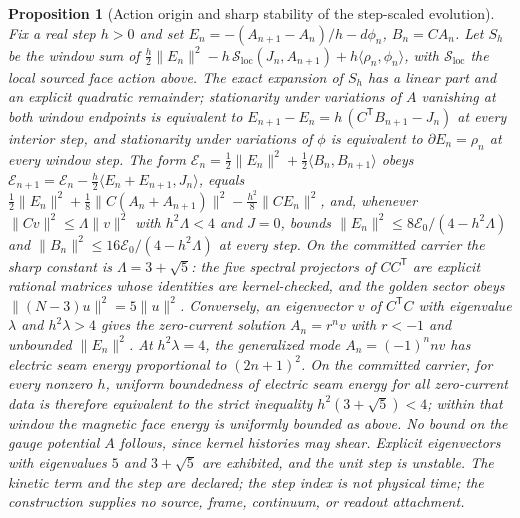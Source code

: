 \documentclass[11pt]{article}
\newtheorem{proposition}[theorem]{Proposition}
\theoremstyle{remark}
\theoremstyle{plain}
\begin{document}
\begin{proposition}[Action origin and sharp stability of the step-scaled evolution]
\label{prop:scaled-maxwell-stability}
Fix a real step \(h>0\) and set \(E_n=-(A_{n+1}-A_n)/h-d\phi_n\), \(B_n=CA_n\).
Let \(S_h\) be the window sum of
\(\tfrac h2\lVert E_n\rVert^2-h\,\mathcal S_{\mathrm{loc}}(J_n,A_{n+1})+h\langle\rho_n,\phi_n\rangle\),
with \(\mathcal S_{\mathrm{loc}}\) the local sourced face action above. The exact
expansion of \(S_h\) has a linear part and an explicit quadratic remainder;
stationarity under variations of \(A\) vanishing at both window endpoints is
equivalent to \(E_{n+1}-E_n=h\,(C^{\mathsf T}B_{n+1}-J_n)\) at every interior
step, and stationarity under variations of \(\phi\) is equivalent to
\(\partial E_n=\rho_n\) at every window step. The form
\(\mathcal E_n=\tfrac12\lVert E_n\rVert^2+\tfrac12\langle B_n,B_{n+1}\rangle\)
obeys \(\mathcal E_{n+1}=\mathcal E_n-\tfrac h2\langle E_n+E_{n+1},J_n\rangle\),
equals \(\tfrac12\lVert E_n\rVert^2+\tfrac18\lVert C(A_n+A_{n+1})\rVert^2-\tfrac{h^2}8\lVert CE_n\rVert^2\),
and, whenever \(\lVert Cv\rVert^2\le\Lambda\lVert v\rVert^2\) with \(h^2\Lambda<4\)
and \(J=0\), bounds \(\lVert E_n\rVert^2\le 8\mathcal E_0/(4-h^2\Lambda)\) and
\(\lVert B_n\rVert^2\le 16\mathcal E_0/(4-h^2\Lambda)\) at every step. On the
committed carrier the sharp constant is \(\Lambda=3+\sqrt5\): the five spectral
projectors of \(CC^{\mathsf T}\) are explicit rational matrices whose identities
are kernel-checked, and the golden sector obeys \(\lVert(N-3)u\rVert^2=5\lVert u\rVert^2\).
Conversely, an eigenvector \(v\) of \(C^{\mathsf T}C\) with eigenvalue \(\lambda\)
and \(h^2\lambda>4\) gives the zero-current solution \(A_n=r^nv\) with \(r<-1\) and
unbounded \(\lVert E_n\rVert^2\). At \(h^2\lambda=4\), the generalized mode
\(A_n=(-1)^n n v\) has electric seam energy proportional to
\((2n+1)^2\). On the committed carrier, for every nonzero \(h\), uniform
boundedness of electric seam energy for all zero-current data is therefore
equivalent to the strict inequality \(h^2(3+\sqrt5)<4\); within that window
the magnetic face energy is uniformly bounded as above. No bound on the gauge
potential \(A\) follows, since kernel histories may shear. Explicit
eigenvectors with eigenvalues \(5\) and \(3+\sqrt5\) are exhibited, and the
unit step is unstable. The kinetic term and the step are declared; the step
index is not physical time; the construction supplies no source, frame,
continuum, or readout attachment.
\end{proposition}
\end{document}
